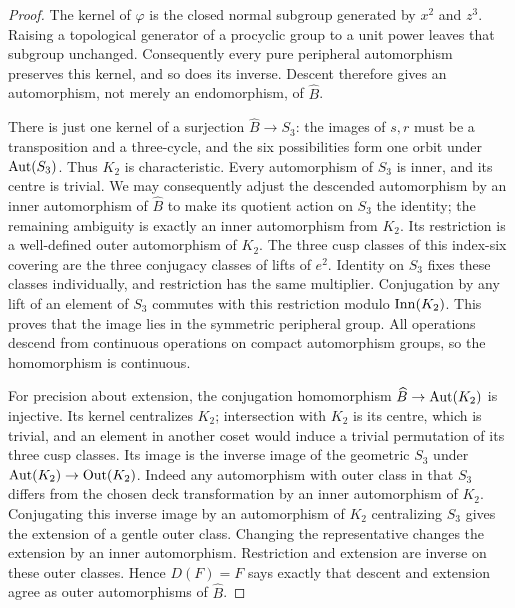 \begin{proof}
The kernel of $\varphi$ is the closed normal subgroup generated by
$x^2$ and $z^3$. Raising a topological generator of a procyclic group
to a unit power leaves that subgroup unchanged. Consequently every
pure peripheral automorphism preserves this kernel, and so does its
inverse. Descent therefore gives an automorphism, not merely an
endomorphism, of $\widehat B$.

There is just one kernel of a surjection $\widehat B\to S_3$:
the images of $s,r$ must be a transposition and a three-cycle,
and the six possibilities form one orbit under $\operatorname{Aut}(S_3)$.
Thus $K_2$ is characteristic. Every automorphism of $S_3$ is inner,
and its centre is trivial. We may consequently adjust the descended
automorphism by an inner automorphism of $\widehat B$ to make its
quotient action on $S_3$ the identity; the remaining ambiguity is
exactly an inner automorphism from $K_2$. Its restriction is a
well-defined outer automorphism of $K_2$. The three cusp classes
of this index-six covering are the three conjugacy classes of
lifts of $e^2$. Identity on $S_3$ fixes these classes individually,
and restriction has the same multiplier. Conjugation by any lift
of an element of $S_3$ commutes with this restriction modulo
$\operatorname{Inn}(K_2)$. This proves that the image lies in the symmetric
peripheral group. All operations descend from continuous operations
on compact automorphism groups, so the homomorphism is continuous.

For precision about extension, the conjugation homomorphism
$\widehat B\to\operatorname{Aut}(K_2)$ is injective. Its kernel centralizes $K_2$;
intersection with $K_2$ is its centre, which is trivial, and an
element in another coset would induce a trivial permutation of its
three cusp classes. Its image is the inverse image of the geometric
$S_3$ under $\operatorname{Aut}(K_2)\to\operatorname{Out}(K_2)$. Indeed any automorphism with
outer class in that $S_3$ differs from the chosen deck transformation
by an inner automorphism of $K_2$. Conjugating this inverse image by
an automorphism of $K_2$ centralizing $S_3$ gives the extension of a
gentle outer class. Changing the representative changes the extension
by an inner automorphism. Restriction and extension are inverse on
these outer classes. Hence $D(F)=F$ says exactly that descent and
extension agree as outer automorphisms of $\widehat B$.


\end{proof}
